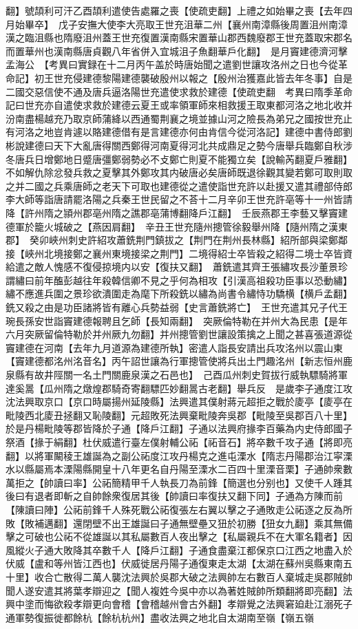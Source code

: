 翻】號頡利可汗乙酉頡利遣使告處羅之喪【使疏吏翻】上禮之如始畢之喪【去年四月始畢卒】　戊子安撫大使李大亮取王世充沮華二州【襄州南漳縣後周置沮州南漳漢之臨沮縣也隋廢沮州蓋王世充復置漢南縣宋置華山郡西魏廢郡王世充蓋取宋郡名而置華州也漢南縣唐貞觀八年省併入宜城沮子魚翻華戶化翻】　是月竇建德濟河擊孟海公　【考異曰實録在十二月丙午盖於時唐始聞之遣劉世讓攻洛州之日也今從革命記】初王世充侵建德黎陽建德襲破殷州以報之【殷州治獲嘉此皆去年冬事】自是二國交惡信使不通及唐兵逼洛陽世充遣使求救於建德【使疏吏翻　考異曰隋季革命記曰世充亦自遣使求救於建德云夏王或率領軍師來相救援王取東都河洛之地北收并汾南盡楊越充乃取京師蒲絳以西通蜀荆襄之境並據山河之險長為弟兄之國按世充止有河洛之地豈肯遽以賂建德借有是言建德亦何由肯信今從河洛記】建德中書侍郎劉彬說建德曰天下大亂唐得關西鄭得河南夏得河北共成鼎足之勢今唐舉兵臨鄭自秋涉冬唐兵日增鄭地日蹙唐彊鄭弱勢必不攴鄭亡則夏不能獨立矣【說輸芮翻夏戶雅翻】不如解仇除忿發兵救之夏擊其外鄭攻其内破唐必矣唐師既退徐觀其變若鄭可取則取之并二國之兵乘唐師之老天下可取也建德從之遣使詣世充許以赴援又遣其禮部侍郎李大師等詣唐請罷洛陽之兵秦王世民留之不荅十二月辛卯王世充許亳等十一州皆請降【許州隋之頴州郡亳州隋之譙郡亳蒲博翻降戶江翻】　壬辰燕郡王李藝又擊竇建德軍於籠火城破之【燕因肩翻】　辛丑王世充隨州摠管徐毅舉州降【隨州隋之漢東郡】　癸卯峽州刺史許紹攻蕭銑荆門鎮拔之【荆門在荆州長林縣】紹所部與梁鄭鄰接【峽州北境接鄭之襄州東境接梁之荆門】二境得紹士卒皆殺之紹得二境士卒皆資給遣之敵人愧感不復侵掠境内以安【復扶又翻】　蕭銑遣其齊王張繡攻長沙董景珍謂繡曰前年醢彭越往年殺韓信卿不見之乎何為相攻【引漢高祖殺功臣事以恐動繡】繡不應進兵圍之景珍欲潰圍走為麾下所殺銑以繡為尚書令繡恃功驕横【横戶孟翻】銑又殺之由是功臣諸將皆有離心兵勢益弱【史言蕭銑將亡】　王世充遣其兄子代王琬長孫安世詣竇建德報聘且乞師【長知兩翻】　突厥倫特勒在并州大為民患【是年六月突厥留倫特勒於并州厥九勿翻】并州摠管劉世讓設策擒之上聞之甚喜張道源從竇建德在河南【去年九月道源為建德所執】密遣人詣長安請出兵攻洺州以震山東【竇建德都洺州洺音名】丙午詔世讓為行軍摠管使將兵出土門趣洺州【新志恒州鹿泉縣有故井陘關一名土門關鹿泉漢之石邑也】　己酉瓜州刺史賀拔行威執驃騎將軍達奚暠【瓜州隋之燉煌郡騎奇寄翻驃匹妙翻暠古老翻】舉兵反　是歲李子通度江攻沈法興取京口【京口時屬揚州延陵縣】法興遣其僕射蔣元超拒之戰於庱亭【庱亭在毗陵西北庱丑拯翻又恥陵翻】元超敗死法興棄毗陵奔吳郡【毗陵至吳郡百八十里】於是丹楊毗陵等郡皆降於子通【降戶江翻】子通以法興府掾李百藥為内史侍郎國子祭酒【掾于絹翻】杜伏威遣行臺左僕射輔公祏【祏音石】將卒數千攻子通【將即亮翻】以將軍闞稜王雄誕為之副公祏度江攻丹楊克之進屯溧水【隋志丹陽郡治江寜溧水以縣屬焉本溧陽縣開皇十八年更名自丹陽至溧水二百四十里溧音栗】子通帥衆數萬拒之【帥讀曰率】公祏簡精甲千人執長刀為前鋒【簡選也分别也】又使千人踵其後曰有退者即斬之自帥餘衆復居其後【帥讀曰率復扶又翻下同】子通為方陳而前【陳讀曰陣】公祏前鋒千人殊死戰公祏復張左右翼以擊之子通敗走公祏逐之反為所敗【敗補邁翻】還閉壁不出王雄誕曰子通無壁壘又狃於初勝【狃女九翻】乘其無備擊之可破也公祏不從雄誕以其私屬數百人夜出擊之【私屬親兵不在大軍名籍者】因風縱火子通大敗降其卒數千人【降戶江翻】子通食盡棄江都保京口江西之地盡入於伏威【盧和等州皆江西也】伏威徙居丹陽子通復東走太湖【太湖在蘇州吳縣東南五十里】收合亡散得二萬人襲沈法興於吳郡大破之法興帥左右數百人棄城走吳郡賊帥聞人遂安遣其將葉孝辯迎之【聞人複姓今吳中亦以為著姓賊帥所類翻將即亮翻】法興中塗而悔欲殺孝辯更向會稽【會稽越州會古外翻】孝辯覺之法興窘廹赴江溺死子通軍勢復振徙都餘杭【餘杭杭州】盡收法興之地北自太湖南至嶺【嶺五嶺